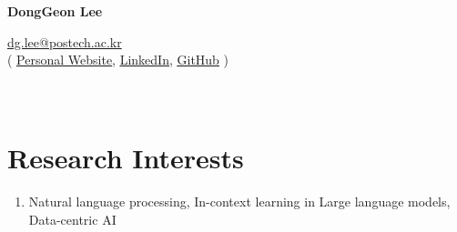 \documentclass[letterpaper,11pt]{article}
\begin{document}
    \pagestyle{fancy}
    \thispagestyle{fancy}
    
    \begin{center}
        {\LARGE{\bf{DongGeon Lee}}\\}
    \end{center}
    
    \vspace{-14pt}
    
    \begin{center} 
        {\href{mailto:dg.lee@postech.ac.kr}{dg.lee@postech.ac.kr} \\}
        {
            (
            \underline{\href{https://donggeon.github.io/}{Personal Website}}, 
            \underline{\href{https://www.linkedin.com/in/dong-geon-lee/}{LinkedIn}}, 
            \underline{\href{https://github.com/oneonlee}{GitHub}}
            )
        }
    \end{center}

    \section{\\Research Interests}
    \begin{enumerate}[noitemsep, leftmargin=*,label={}]
    \item{Natural language processing, In-context learning in Large language models, Data-centric AI}
    \end{enumerate}
    
\end{document}
